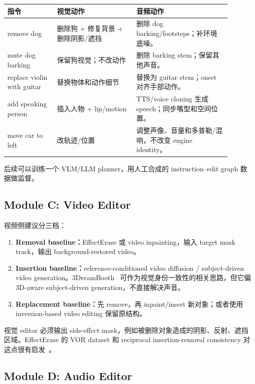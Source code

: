 \begin{longtable}{p{0.20\linewidth}p{0.32\linewidth}p{0.38\linewidth}}
\toprule
\textbf{指令} & \textbf{视觉动作} & \textbf{音频动作} \\
\midrule
remove dog & 删除狗 + 修复背景 + 删除阴影/遮挡 & 删除 dog barking/footsteps；补环境底噪。 \\
\midrule
mute dog barking & 保留狗视觉；不改动作 & 删除 barking stem；保留其他声音。 \\
\midrule
replace violin with guitar & 替换物体和动作细节 & 替换为 guitar stem；onset 对齐手部动作。 \\
\midrule
add speaking person & 插入人物 + lip/motion & TTS/voice cloning 生成 speech；同步嘴型和空间位置。 \\
\midrule
move car to left & 改轨迹/位置 & 调整声像、音量和多普勒/混响，不改变 engine identity。 \\
\bottomrule
\end{longtable}

后续可以训练一个 VLM/LLM planner，用人工合成的 instruction--edit graph 数据做监督。

\subsection{Module C: Video Editor}

视频侧建议分三档：

\begin{enumerate}[leftmargin=2em]
  \item \textbf{Removal baseline：}EffectErase 或 video inpainting，输入 target mask track，输出 background-restored video。
  \item \textbf{Insertion baseline：}reference-conditioned video diffusion / subject-driven video generation。3DreamBooth~\cite{threedreambooth2026} 可作为视觉身份一致性的相关思路，但它偏 3D-aware subject-driven generation，不直接解决声音。
  \item \textbf{Replacement baseline：}先 remove，再 inpaint/insert 新对象；或者使用 inversion-based video editing 保留原结构。
\end{enumerate}

视觉 editor 必须输出 side-effect mask，例如被删除对象造成的阴影、反射、遮挡区域。EffectErase 的 VOR dataset 和 reciprocal insertion-removal consistency 对这点很有启发~\cite{effecterase2026}。

\subsection{Module D: Audio Editor}

